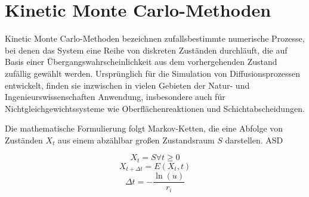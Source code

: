 \section{Kinetic Monte Carlo-Methoden}

Kinetic Monte Carlo-Methoden bezeichnen zufallsbestimmte numerische Prozesse, bei denen das System eine Reihe von diskreten Zuständen durchläuft, die auf Basis einer Übergangswahrscheinlichkeit aus dem vorhergehenden Zustand zufällig gewählt werden.
Ursprünglich für die Simulation von  Diffusionsprozessen entwickelt, finden sie inzwischen in vielen Gebieten der Natur- und Ingenieurswissenschaften Anwendung, insbesondere auch für Nichtgleichgewichtssysteme wie  Oberflächenreaktionen und Schichtabscheidungen.

Die mathematische Formulierung folgt Markov-Ketten, die eine Abfolge von Zuständen $X_t$ aus einem abzählbar großen Zustandsraum $S$ darstellen. ASD

$$
X_t = S \forall t \geq 0
$$
$$
X_{t+\Delta t} = E(X_t, t)
$$
$$
\Delta t = - \frac{\ln(u)}{r_i}
$$

